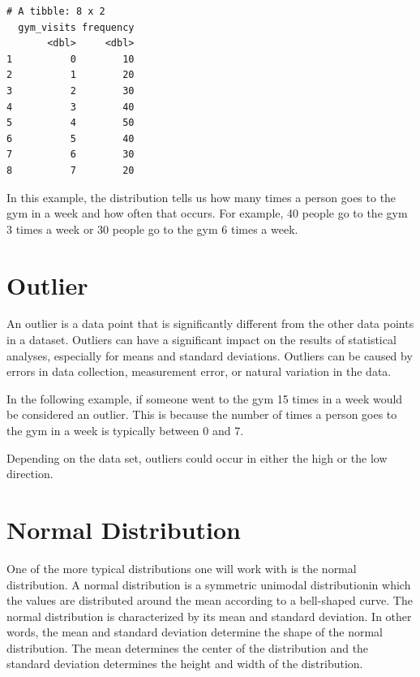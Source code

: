 \documentclass[
  letterpaper,
  DIV=11,
  numbers=noendperiod]{scrreprt}
\begin{document}
\begin{verbatim}
# A tibble: 8 x 2
  gym_visits frequency
       <dbl>     <dbl>
1          0        10
2          1        20
3          2        30
4          3        40
5          4        50
6          5        40
7          6        30
8          7        20
\end{verbatim}

In this example, the distribution tells us how many times a person goes
to the gym in a week and how often that occurs. For example, 40 people
go to the gym 3 times a week or 30 people go to the gym 6 times a week.

\section*{Outlier}\label{outlier}


An outlier is a data point that is significantly different from the
other data points in a dataset. Outliers can have a significant impact
on the results of statistical analyses, especially for means and
standard deviations. Outliers can be caused by errors in data
collection, measurement error, or natural variation in the data.

In the following example, if someone went to the gym 15 times in a week
would be considered an outlier. This is because the number of times a
person goes to the gym in a week is typically between 0 and 7.

Depending on the data set, outliers could occur in either the high or
the low direction.

\section*{Normal Distribution}\label{normal-distribution}


One of the more typical distributions one will work with is the normal
distribution. A normal distribution is a symmetric unimodal
distributionin which the values are distributed around the mean
according to a bell-shaped curve. The normal distribution is
characterized by its mean and standard deviation. In other words, the
mean and standard deviation determine the shape of the normal
distribution. The mean determines the center of the distribution and the
standard deviation determines the height and width of the distribution.
\end{document}

